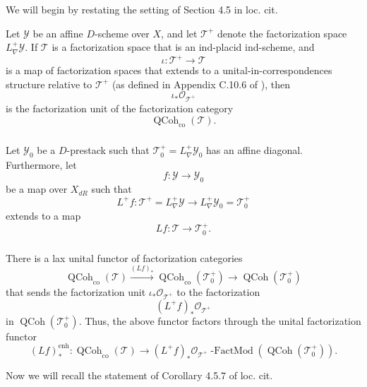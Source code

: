 \documentclass[10pt]{amsart}
\theoremstyle{remark}
\newcommand{\on}[1]{\operatorname{#1}}
\newcommand{\QCoh}{\on{QCoh}}
\newcommand{\sssec}[1]{\subsubsection{}}
\begin{document}
\sssec{}
We will begin by restating the setting of Section 4.5 in loc. cit.

Let $\mathcal{Y}$ be an affine $D$-scheme over $X$, and let $\mathcal{T}^+$ denote the factorization space $L_{\nabla}^+\mathcal{Y}$. If $\mathcal{T}$ is a factorization space that is an ind-placid ind-scheme, and
$$
\iota : \mathcal{T}^+ \to \mathcal{T}
$$
is a map of factorization spaces that extends to a unital-in-correspondences structure relative to $\mathcal{T}^+$ (as defined in Appendix C.10.6 of \cite{GLC2}), then
$$
\iota_* \mathcal{O}_{\mathcal{T}^+}
$$
is the factorization unit of the factorization category
$$
\QCoh_{\on{co}}(\mathcal{T}).
$$

\sssec{}
Let $\mathcal{Y}_0$ be a $D$-prestack such that $\mathcal{T}_0^+ = L_{\nabla}^+ \mathcal{Y}_0$ has an affine diagonal. Furthermore, let 
$$
f : \mathcal{Y} \to \mathcal{Y}_0
$$
be a map over $X_{dR}$ such that
$$
L^+f : \mathcal{T}^+ = L_{\nabla}^+ \mathcal{Y} \to L_{\nabla}^+ \mathcal{Y}_0 = \mathcal{T}_0^+
$$
extends to a map
$$
Lf : \mathcal{T} \to \mathcal{T}_0^+.
$$

\sssec{}
There is a lax unital functor of factorization categories
$$
\QCoh_{\on{co}}(\mathcal{T}) \overset{(Lf)_*}{\to} \QCoh_{\on{co}}(\mathcal{T}_0^+) \to \QCoh(\mathcal{T}_0^+)
$$
that sends the factorization unit $\iota_* \mathcal{O}_{\mathcal{T}^+}$ to the factorization
$$
(L^+f)_*\mathcal{O}_{\mathcal{T}^+}
$$
in $\QCoh(\mathcal{T}_0^+)$. Thus, the above functor factors through the unital factorization functor
$$
(Lf)_*^{\on{enh}} : \QCoh_{\on{co}}(\mathcal{T}) \to (L^+f)_*\mathcal{O}_{\mathcal{T}^+}\on{-FactMod} (\QCoh(\mathcal{T}_0^+)).
$$

Now we will recall the statement of Corollary 4.5.7 of loc. cit.
\end{document}
